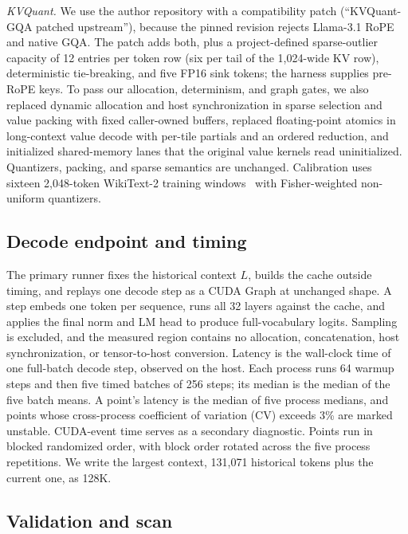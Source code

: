 \documentclass{article}
\begin{document}
\textit{KVQuant.} We use the author repository with a compatibility patch (``KVQuant-GQA patched upstream''), because the pinned revision rejects Llama-3.1 RoPE and native GQA.
The patch adds both, plus a project-defined sparse-outlier capacity of 12 entries per token row (six per tail of the 1,024-wide KV row), deterministic tie-breaking, and five FP16 sink tokens; the harness supplies pre-RoPE keys.
To pass our allocation, determinism, and graph gates, we also replaced dynamic allocation and host synchronization in sparse selection and value packing with fixed caller-owned buffers, replaced floating-point atomics in long-context value decode with per-tile partials and an ordered reduction, and initialized shared-memory lanes that the original value kernels read uninitialized.
Quantizers, packing, and sparse semantics are unchanged.
Calibration uses sixteen 2,048-token WikiText-2 training windows~\citep{merity_wikitext} with Fisher-weighted non-uniform quantizers.

\subsection{Decode endpoint and timing}
\label{sec:timing}

The primary runner fixes the historical context $L$, builds the cache outside timing, and replays one decode step as a CUDA Graph at unchanged shape.
A step embeds one token per sequence, runs all 32 layers against the cache, and applies the final norm and LM head to produce full-vocabulary logits.
Sampling is excluded, and the measured region contains no allocation, concatenation, host synchronization, or tensor-to-host conversion.
Latency is the wall-clock time of one full-batch decode step, observed on the host.
Each process runs 64 warmup steps and then five timed batches of 256 steps; its median is the median of the five batch means.
A point's latency is the median of five process medians, and points whose cross-process coefficient of variation (CV) exceeds 3\% are marked unstable.
CUDA-event time serves as a secondary diagnostic.
Points run in blocked randomized order, with block order rotated across the five process repetitions.
We write the largest context, 131,071 historical tokens plus the current one, as 128K.

\subsection{Validation and scan}
\label{sec:validation}
\end{document}
